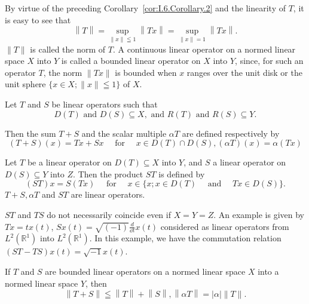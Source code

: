 By virtue of the preceding Corollary~\ref{cor:I.6.Corollary.2} and the linearity of $T$, it is easy to see that 
\begin{equation}\label{eq:I.6.6}
\left\| T \right\| = \sup\limits_{\left\| x \right\| \leqq 1} \left\| T x \right\| = \sup\limits_{\left\| x \right\| = 1} \left\| T x \right\|.
\end{equation}
$\|T\|$ is called the norm of $T$. A continuous linear operator on a normed linear space $X$ into $Y$ is called a bounded linear operator on $X$ into $Y$, since, for such an operator $T$, the norm $\|Tx\|$ is bounded when $x$ ranges over the unit disk or the unit sphere $\{x \in X; \|x\| \leqq 1\}$ of $X$. 

\begin{definition}\label{def:I.6.Definition.2} Let $T$ and $S$ be linear operators such that 
\[
D (T) \text{ and } D (S) \subseteq X, \text{ and } R (T) \text{ and } R (S) \subseteq Y.
\]
\end{definition}

Then the sum $T + S$ and the scalar multiple $\alpha T$ are defined respectively by 
\[
(T + S) (x) = T x + S x \quad \text{ for } \quad x \in D (T) \cap D (S), (\alpha T) (x) = \alpha (T x)
\]

Let $T$ be a linear operator on $D(T) \subseteq X$ into $Y$, and $S$ a linear operator on $D(S) \subseteq Y$ into $Z$. Then the product $ST$ is defined by 
\[
(S T) x = S (T x) \quad \text{ for } \quad x \in \{x; x \in D (T) \quad \text{ and } \quad T x \in D (S) \}.
\]
$T + S, \alpha T$ and $ST$ are linear operators. 

\begin{remarku} $ST$ and $TS$ do not necessarily coincide even if $X = Y = Z$. An example is given by $Tx = tx(t)$, $Sx(t) = \sqrt{(-1)}\frac{d}{\dd t} x(t)$ considered as linear operators from $L^2(\mathbb{R}^{1})$ into $L^2(\mathbb{R}^{1})$. In this example, we have the commutation relation $(ST- TS)x(t) = \sqrt{-1} x(t)$. 
\end{remarku}

\begin{proposition}\label{prop:I.6.Proposition.2} If $T$ and $S$ are bounded linear operators on a normed linear space $X$ into a normed linear space $Y$, then 
\begin{equation}\label{eq:I.6.7}
\left\| T + S \right\| \leqq \left\| T \right\| + \left\| S \right\|, \left\| \alpha T \right\| = | \alpha | \| T \|.
\end{equation}
\end{proposition}

